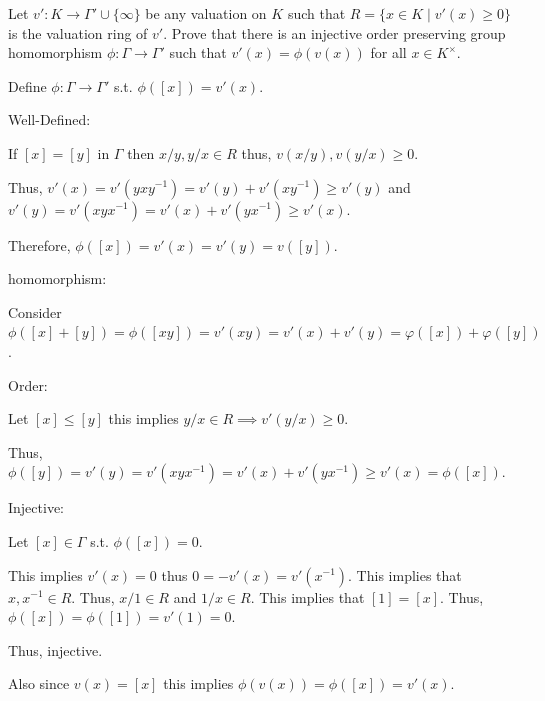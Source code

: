 \documentclass[12pt, letterpaper]{article}
\begin{document}
\begin{problem}{}
Let $v' : K \to \Gamma' \cup \{\infty\}$ be any valuation on $K$ such that $R = \{x \in K \mid v'(x) \geq 0\}$ is the
valuation ring of $v'$. Prove that there is an injective order preserving group homomorphism
$\phi : \Gamma \to\Gamma'$ such that $v'(x) = \phi(v(x))$ for all $x \in K^\times$.
\end{problem}
\begin{problemproof}
    Define $\phi : \Gamma \to \Gamma'$ s.t. $\phi([x])= v'(x)$.

    Well-Defined:

    If $[x]=[y]$ in $\Gamma$ then $x/y, y/x \in R$ thus, $v(x/y),v(y/x) \geq 0$.

    Thus, $v'(x)=v'(yxy^{-1})=v'(y)+v'(xy^{-1}) \geq v'(y)$ and $v'(y)=v'(xyx^{-1})=v'(x)+v'(yx^{-1}) \geq v'(x)$.

    Therefore, $\phi([x])=v'(x)=v'(y)=v([y])$.

    homomorphism:

    Consider $\phi([x]+[y])=\phi([xy]) = v'(xy) = v'(x)+v'(y)=\varphi([x])+\varphi([y])$.

    Order:

    Let $[x] \leq [y]$ this implies $y/x \in R \implies v'(y/x) \geq 0$.

    Thus, $\phi([y])=v'(y)=v'(xyx^{-1}) = v'(x) + v'(yx^{-1}) \geq v'(x) = \phi([x])$.
    
    Injective:

    Let $[x] \in \Gamma$ s.t. $\phi([x]) = 0$.

    This implies $v'(x)=0$ thus $0=-v'(x)=v'(x^{-1})$. This implies that $x,x^{-1} \in R$. Thus, $x/1 \in R$ and $1/x \in R$. This implies that $[1]=[x]$. Thus, $\phi([x])=\phi([1])=v'(1)=0$.

    Thus, injective.

    Also since $v(x)=[x]$ this implies $\phi(v(x))=\phi([x])=v'(x)$.
\end{problemproof}
\end{document}
